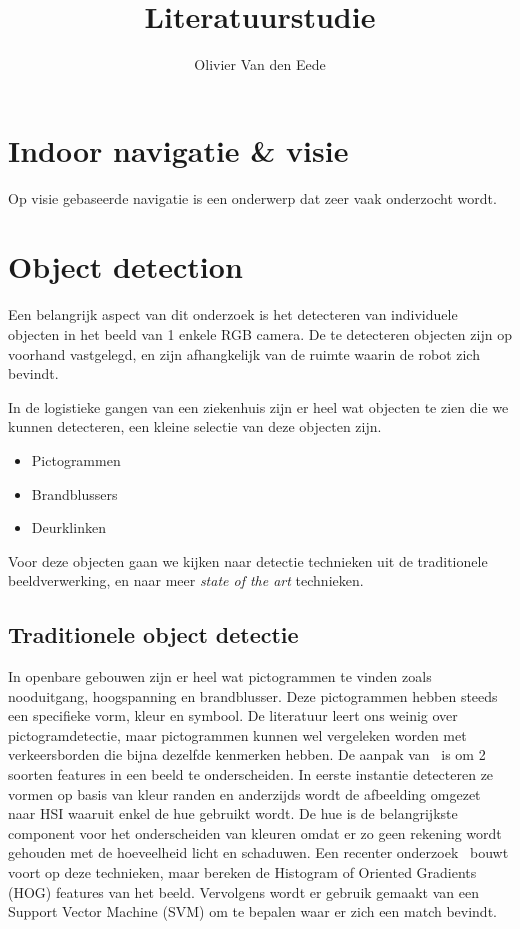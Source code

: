 \documentclass[11pt,a4paper]{article}
\title{Literatuurstudie}
\author{Olivier Van den Eede}
\begin{document}
    \maketitle
    
    \section{Indoor navigatie \& visie}
        Op visie gebaseerde navigatie is een onderwerp dat zeer vaak onderzocht wordt.
        
    \section{Object detection}

        Een belangrijk aspect van dit onderzoek is het detecteren van individuele objecten in het beeld van 1 enkele RGB camera.
        De te detecteren objecten zijn op voorhand vastgelegd, en zijn afhangkelijk van de ruimte waarin de robot zich bevindt.

        In de logistieke gangen van een ziekenhuis zijn er heel wat objecten te zien die we kunnen detecteren, een kleine selectie van deze objecten zijn.

        \begin{itemize}
            \item Pictogrammen
            \item Brandblussers
            \item Deurklinken
        \end{itemize}

        Voor deze objecten gaan we kijken naar detectie technieken uit de traditionele beeldverwerking, en naar meer \textit{state of the art} technieken. 


        \subsection{Traditionele object detectie}
            In openbare gebouwen zijn er heel wat pictogrammen te vinden zoals nooduitgang, hoogspanning en brandblusser. Deze pictogrammen hebben steeds een specifieke vorm, kleur en symbool.
            De literatuur leert ons weinig over pictogramdetectie, maar pictogrammen kunnen wel vergeleken worden met verkeersborden die bijna dezelfde kenmerken hebben.
            De aanpak van~\cite{Fang2003} is om 2 soorten features in een beeld te onderscheiden. In eerste instantie detecteren ze vormen op basis van kleur randen en anderzijds wordt de
            afbeelding omgezet naar HSI waaruit enkel de hue gebruikt wordt. De hue is de belangrijkste component voor het onderscheiden van kleuren omdat er zo geen rekening wordt gehouden
            met de hoeveelheid licht en schaduwen.
            Een recenter onderzoek~\cite{Zabihi2017} bouwt voort op deze technieken,
            maar bereken de Histogram of Oriented Gradients (HOG) features van het beeld. Vervolgens wordt er gebruik gemaakt van een Support Vector Machine (SVM) om te bepalen waar er zich een match bevindt.
\end{document}

